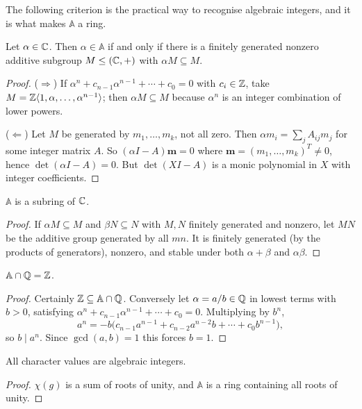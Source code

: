 \documentclass[a4paper]{scrartcl}
\newcommand{\gen}[1]{\langle #1 \rangle}
\begin{document}
The following criterion is the practical way to recognise algebraic integers, and it is what makes $\mathbb A$ a ring.

\begin{proposition}
	Let $\alpha\in\mathbb{C}$. Then $\alpha\in\mathbb A$ if and only if there is a finitely generated nonzero additive subgroup $M \leq (\mathbb{C},+)$ with $\alpha M\subseteq M$.
\end{proposition}
\begin{proof}
	($\Rightarrow$) If $\alpha^n + c_{n-1}\alpha^{n-1}+\cdots+c_0 = 0$ with $c_i\in\mathbb{Z}$, take $M = \Z\gen{1,\alpha,\dots,\alpha^{n-1}}$; then $\alpha M\subseteq M$ because $\alpha^n$ is an integer combination of lower powers.

	($\Leftarrow$) Let $M$ be generated by $m_1,\dots,m_k$, not all zero. Then $\alpha m_i = \sum_j A_{ij}m_j$ for some integer matrix $A$. So $(\alpha I - A)\mathbf m = 0$ where $\mathbf m = (m_1,\dots,m_k)^T\neq 0$, hence $\det(\alpha I - A) = 0$. But $\det(XI - A)$ is a monic polynomial in $X$ with integer coefficients.
\end{proof}

\begin{corollary}
	$\mathbb A$ is a subring of $\mathbb{C}$.
\end{corollary}
\begin{proof}
	If $\alpha M\subseteq M$ and $\beta N\subseteq N$ with $M, N$ finitely generated and nonzero, let $MN$ be the additive group generated by all $mn$. It is finitely generated (by the products of generators), nonzero, and stable under both $\alpha+\beta$ and $\alpha\beta$.
\end{proof}

\begin{proposition}
	$\mathbb A\cap\mathbb{Q} = \mathbb{Z}$.
\end{proposition}
\begin{proof}
	Certainly $\mathbb{Z}\subseteq\mathbb A\cap\mathbb{Q}$. Conversely let $\alpha = a/b\in\mathbb{Q}$ in lowest terms with $b>0$, satisfying $\alpha^n+c_{n-1}\alpha^{n-1}+\cdots+c_0 = 0$. Multiplying by $b^n$,
	$$a^n = -b\big(c_{n-1}a^{n-1}+c_{n-2}a^{n-2}b+\cdots+c_0b^{n-1}\big),$$
	so $b\mid a^n$. Since $\gcd(a,b)=1$ this forces $b = 1$.
\end{proof}

\begin{corollary}
	All character values are algebraic integers.
\end{corollary}
\begin{proof}
	$\chi(g)$ is a sum of roots of unity, and $\mathbb A$ is a ring containing all roots of unity.
\end{proof}
\end{document}
